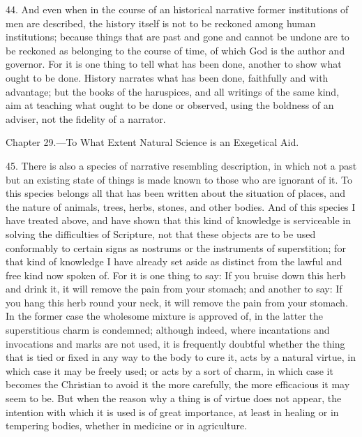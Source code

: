 44. And even when in the course of an historical narrative former institutions of men are described, the history itself is not to be reckoned among human institutions; because things that are past and gone and cannot be undone are to be reckoned as belonging to the course of time, of which God is the author and governor. For it is one thing to tell what has been done, another to show what ought to be done. History narrates what has been done, faithfully and with advantage; but the books of the haruspices, and all writings of the same kind, aim at teaching what ought to be done or observed, using the boldness of an adviser, not the fidelity of a narrator.


Chapter 29.—To What Extent Natural Science is an Exegetical Aid.

45. There is also a species of narrative resembling description, in which not a past but an existing state of things is made known to those who are ignorant of it. To this species belongs all that has been written about the situation of places, and the nature of animals, trees, herbs, stones, and other bodies. And of this species I have treated above, and have shown that this kind of knowledge is serviceable in solving the difficulties of Scripture, not that these objects are to be used conformably to certain signs as nostrums or the instruments of superstition; for that kind of knowledge I have already set aside as distinct from the lawful and free kind now spoken of. For it is one thing to say: If you bruise down  this herb and drink it, it will remove the pain from your stomach; and another to say: If you hang this herb round your neck, it will remove the pain from your stomach. In the former case the wholesome mixture is approved of, in the latter the superstitious charm is condemned; although indeed, where incantations and invocations and marks are not used, it is frequently doubtful whether the thing that is tied or fixed in any way to the body to cure it, acts by a natural virtue, in which case it may be freely used; or acts by a sort of charm, in which case it becomes the Christian to avoid it the more carefully, the more efficacious it may seem to be. But when the reason why a thing is of virtue does not appear, the intention with which it is used is of great importance, at least in healing or in tempering bodies, whether in medicine or in agriculture.

